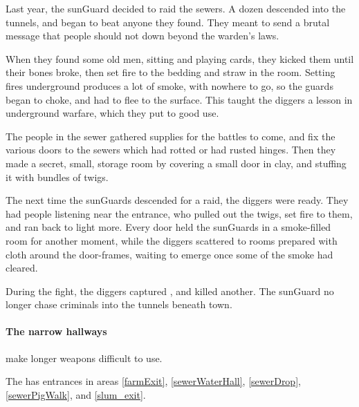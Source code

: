 \begin{exampletext}
  \label{guardAttackHistory}
  Last year, the \gls{sunGuard} decided to raid the sewers.
  A dozen descended into the tunnels, and began to beat anyone they found.
  They meant to send a brutal message that people should not down beyond the \gls{warden}'s laws.

  When they found some old men, sitting and playing cards, they kicked them until their bones broke, then set fire to the bedding and straw in the room.
  Setting fires underground produces a lot of smoke, with nowhere to go, so the guards began to choke, and had to flee to the surface.
  This taught the \glspl{digger} a lesson in underground warfare, which they put to good use.

  The people in the sewer gathered supplies for the battles to come, and fix the various doors to the sewers which had rotted or had rusted hinges.
  Then they made a secret, small, storage room by covering a small door in clay, and stuffing it with bundles of twigs.

  The next time the \glspl{sunGuard} descended for a raid, the \glspl{digger} were ready.
  They had people listening near the entrance, who pulled out the twigs, set fire to them, and ran back to light more.
  Every door held the \glspl{sunGuard} in a smoke-filled room for another moment, while the \glspl{digger} scattered to rooms prepared with cloth around the door-frames, waiting to emerge once some of the smoke had cleared.

  During the fight, the \glspl{digger} captured , and killed another.
  The \gls{sunGuard} no longer chase criminals into the tunnels beneath \gls{town}.
\end{exampletext}

\paragraph{The narrow hallways}
make longer weapons difficult to use.%

The  has entrances in \glspl{area} \ref{farmExit}, \ref{sewerWaterHall}, \ref{sewerDrop}, \ref{sewerPigWalk}, and \ref{slum_exit}.


